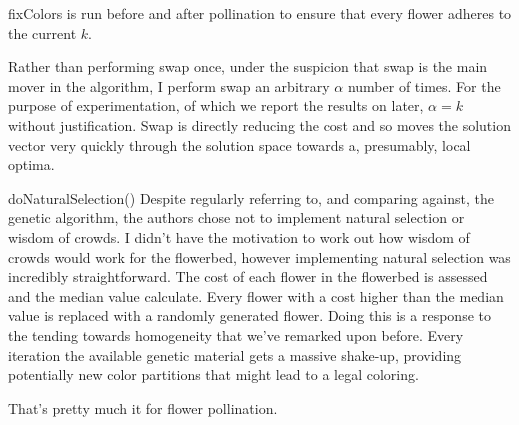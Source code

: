 fixColors is run before and after pollination to ensure that every flower adheres to the current $k$.

Rather than performing swap once, under the suspicion that swap is the main mover in the algorithm, I perform swap an arbitrary $\alpha$ number of times. For the purpose of experimentation, of which we report the results on later,  $\alpha = k$ without justification. Swap is directly reducing the cost and so moves the solution vector very quickly through the solution space towards a, presumably, local optima.

doNaturalSelection()
Despite regularly referring to, and comparing against, the genetic algorithm, the authors chose not to implement natural selection or wisdom of crowds. I didn't have the motivation to work out how wisdom of crowds would work for the flowerbed, however implementing natural selection was incredibly straightforward.
The cost of each flower in the flowerbed is assessed and the median value calculate. Every flower with a cost higher than the median value is replaced with a randomly generated flower.
Doing this is a response to the tending towards homogeneity that we've remarked upon before. Every iteration the available genetic material gets a massive shake-up, providing potentially new color partitions that might lead to a legal coloring.

That's pretty much it for flower pollination.









